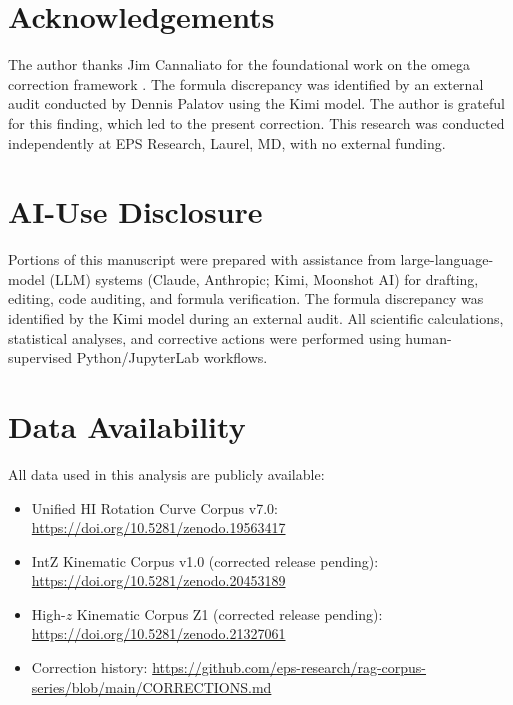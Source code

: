 \documentclass[a4paper,12pt]{article}
\begin{document}
\section*{Acknowledgements}

The author thanks Jim Cannaliato for the foundational work on the
omega correction framework \citep{flynnCannaliato2025}. The formula
discrepancy was identified by an external audit conducted by
Dennis Palatov using the Kimi model. The author is grateful for
this finding, which led to the present correction. This research
was conducted independently at EPS Research, Laurel, MD, with no
external funding.

\section*{AI-Use Disclosure}
Portions of this manuscript were prepared with assistance from
large-language-model (LLM) systems (Claude, Anthropic; Kimi, Moonshot AI)
for drafting, editing, code auditing, and formula verification.
The formula discrepancy was identified by the Kimi model during an
external audit. All scientific calculations, statistical analyses,
and corrective actions were performed using human-supervised
Python/JupyterLab workflows.

\section*{Data Availability}
All data used in this analysis are publicly available:
\begin{itemize}
  \item Unified HI Rotation Curve Corpus v7.0:
        \url{https://doi.org/10.5281/zenodo.19563417}
  \item IntZ Kinematic Corpus v1.0 (corrected release pending):
        \url{https://doi.org/10.5281/zenodo.20453189}
  \item High-$z$ Kinematic Corpus Z1 (corrected release pending):
        \url{https://doi.org/10.5281/zenodo.21327061}
  \item Correction history:
        \url{https://github.com/eps-research/rag-corpus-series/blob/main/CORRECTIONS.md}
\end{itemize}
\end{document}
